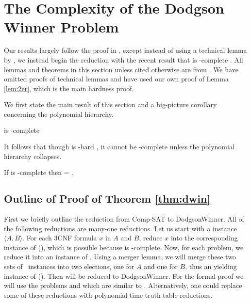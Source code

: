 \section{The Complexity of the Dodgson Winner Problem}
Our results largely follow the proof in \citet{exactdodgson}, except instead of
using a technical lemma by \citet{wag90}, we instead begin the reduction
with the recent result that  is \tp-complete \citep{compsat}.
All lemmas and theorems in this section
unless cited otherwise are from \citet{exactdodgson}.
We have omitted proofs of technical lemmas and have used our own proof of Lemma
\ref{lem:2er}, which is the main hardness proof.

We first state the main result of this section and a big-picture corollary
concerning the polynomial hierarchy.

\begin{theorem}\label{thm:dwin}
     is \tp-complete
\end{theorem}

It follows that though  is \np-hard \citep{bartholdiVoting},
it cannot be \np-complete unless the polynomial hierarchy collapses.

\begin{corollary}
    If  is \np-complete then  = \np.
\end{corollary}

\subsection{Outline of Proof of Theorem \ref{thm:dwin}} \label{subsec:outline}
    First we briefly outline the reduction from Comp-SAT to
DodgsonWinner.
    All of the following reductions are many-one reductions.
Let us start with a \csat instance $\langle A,B \rangle$.
For each 3CNF
formula $x$ in $A$ and $B$, reduce $x$ into the corresponding instance of
 (), which is possible because
 is \np-complete.
Now, for each  problem, we reduce it into an instance of
\dscore.
Using a merger lemma, we will merge these two sets of
\dscore~instances into two elections, one for $A$
and one for $B$, thus an yielding
instance of  ().
Then  will be reduced to DodgsonWinner.
For the formal proof we will use the problems  and
 which are similar to \csat.
Alternatively, one could replace some of these reductions with
polynomial time truth-table reductions.

